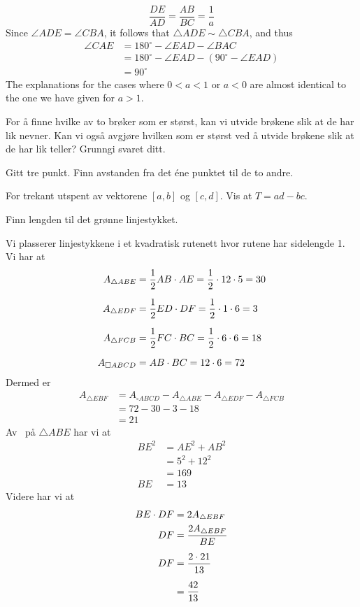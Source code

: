 {\[ \frac{DE}{AD} = \frac{AB}{BC} = \frac{1}{a} \]
Since $\angle ADE = \angle CBA$, it follows that $\triangle ADE \sim \triangle CBA$, and thus
\begin{align*}
	\angle CAE &= 180^\circ - \angle EAD - \angle BAC \\
	&= 180^\circ - \angle EAD - \left(90^\circ - \angle EAD\right) \\
	&= 90^\circ
\end{align*}
The explanations for the cases where $0 < a < 1$ or $a < 0$ are almost identical to the one we have given for $a > 1$.
}

For å finne hvilke av to brøker som er størst, kan vi utvide brøkene slik at de har lik nevner. Kan vi også avgjøre hvilken som er størst ved å utvide brøkene slik at de har lik teller? Grunngi svaret ditt.

Gitt tre punkt. Finn avstanden fra det éne punktet til de to andre.

For trekant utspent av vektorene $[a, b]$ og $[c, d]$. Vis at $T=ad-bc$.

Finn lengden til det grønne linjestykket.

\newpage
{}
Vi plasserer linjestykkene i et kvadratisk rutenett hvor rutene har sidelengde 1.
Vi har at
\begin{align*}
	A_{\triangle ABE}&=\frac{1}{2}AB\cdot AE=\frac{1}{2}\cdot12\cdot5 = 30 \vn
	A_{\triangle EDF}&=\frac{1}{2}ED\cdot DF=\frac{1}{2}\cdot1\cdot6 = 3 \vn
	A_{\triangle FCB}&=\frac{1}{2}FC\cdot BC=\frac{1}{2}\cdot6\cdot6=18\vn
	A_{\square ABCD}&=AB\cdot BC=12\cdot6=72
\end{align*}
Dermed er 
\begin{align*}
	A_{\triangle EBF}&=A_{\square ABCD}-A_{\triangle ABE}-A_{\triangle EDF}-A_{\triangle FCB} \\
	&= 72-30-3-18 \\
	&=21
\end{align*}
Av \pyt\ på $\triangle ABE$ har vi at
\begin{align*}
	BE^2 &= AE^2 + AB^2 \\
	&= 5^2+12^2 \\
	&= 169 \\
	BE &= 13
\end{align*}
Videre har vi at
\begin{align*}
	BE\cdot DF&=2A_{\triangle EBF} \\
	DF &= \frac{2A_{\triangle EBF}}{BE} \br
	DF &= \frac{2\cdot 21}{13} \br
	&= \frac{42}{13}
\end{align*}
\newpage

